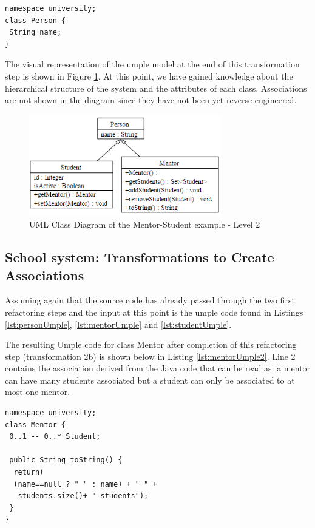 \begin{lstlisting}[style=umpleOut,caption=Person.ump,label=lst:personUmple]
namespace university;
class Person {
 String name;
}
\end{lstlisting}

The visual representation of the umple model at the end of this transformation step is shown in Figure \ref{fig:Example1a2}. At this point, we have gained knowledge about the hierarchical structure of the system and the attributes of each class. Associations are not shown in the diagram since they have not been yet reverse-engineered.

\begin{figure}[h]
\centering
\includegraphics[width=0.75\textwidth]{Figures/Example1a2.png} 
\caption{UML Class Diagram of the Mentor-Student example - Level 2}
\label{fig:Example1a2}
\end{figure}

\subsection{School system: Transformations to Create Associations}

Assuming again that the source code  has already passed through the two first refactoring steps and the input at this point is the umple code found in Listings \ref{lst:personUmple}, \ref{lst:mentorUmple} and \ref{lst:studentUmple}.

The resulting Umple code for class Mentor after completion of this refactoring step (transformation 2b) is shown below in Listing \ref{lst:mentorUmple2}. Line 2 contains the association derived from the Java code that can be read as: a mentor can have many students associated but a student can only be associated to at most one mentor. 

\begin{lstlisting}[style=umpleOut,caption=Mentor.ump,label=lst:mentorUmple2]
namespace university;
class Mentor {
 0..1 -- 0..* Student; 
 
 public String toString() {
  return(
  (name==null ? " " : name) + " " +
   students.size()+ " students");
 }
}
\end{lstlisting}

